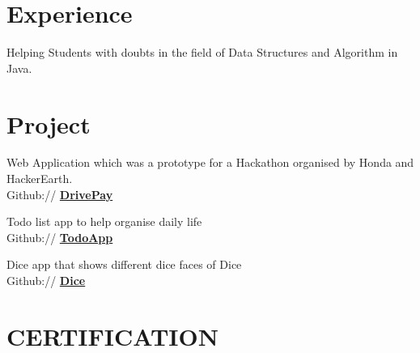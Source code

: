 \documentclass[]{deedy-resume-openfont}
\begin{document}
\begin{minipage}[t]{0.66\textwidth} 


\section{Experience}
\vspace{\topsep} %
\begin{tightemize}
\item Helping Students with doubts in the field of Data Structures and Algorithm in Java.

\end{tightemize}
\sectionsep




\section{Project}
Web Application which was a prototype for a Hackathon organised by Honda and HackerEarth.\\  
Github:// \href{https://github.com/Digvijay-Singh-Dhanker/DrivePay-1}{\bf DrivePay} \\
\sectionsep

Todo list app to help organise daily life\\
Github:// \href{https://github.com/Digvijay-Singh-Dhanker/todoList}{\bf TodoApp} \\
\sectionsep

Dice app that shows different dice faces of Dice\\
Github:// \href{https://github.com/Digvijay-Singh-Dhanker/DiceFlutter}{\bf Dice} \\
\sectionsep

\section{CERTIFICATION} 
\\
\vspace{\topsep} %


\end{minipage}
\end{document}
